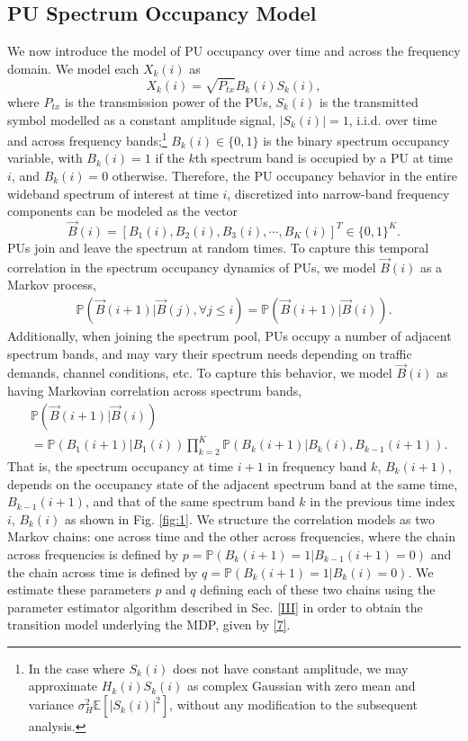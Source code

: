 \documentclass[10pt,twocolumn]{IEEEtran}
\begin{document}
\subsection{PU Spectrum Occupancy Model}
We now introduce the model of PU occupancy over time and across the frequency domain. We model each $X_k(i)$ as 
\begin{equation}\label{4}
    X_k(i) = \sqrt{P_{tx}}B_k(i)S_k(i),
\end{equation}
where $P_{tx}$ is the transmission power of the PUs, $S_k(i)$ is the transmitted symbol modelled as a constant amplitude signal, $|S_k(i)|{=}1$, i.i.d. over time and across frequency bands;\footnote{In the case where $S_k(i)$ does not have constant amplitude, we may approximate $H_{k}(i)S_{k}(i)$ as complex Gaussian with zero mean and variance $\sigma_H^2\mathbb E[|S_{k}(i)|^2]$, without any modification to the subsequent analysis.} $B_k(i){\in}\{0,1\}$ is the binary spectrum occupancy variable, with $B_k(i){=}1$ if the $k$th spectrum band is occupied by a PU at time $i$, and $B_k(i){=}0$ otherwise. Therefore, the PU occupancy behavior in the entire wideband spectrum of interest at time $i$, discretized into narrow-band frequency components can be modeled as the vector 
\begin{equation}\label{5}
    \vec{B}(i) = [B_1(i), B_2(i), B_3(i), \cdots, B_K(i)]^T {\in} \{0, 1\}^K.
\end{equation}
PUs join and leave the spectrum at random times. To capture this temporal correlation in the spectrum occupancy dynamics of PUs, we model $\vec{B}(i)$ as a Markov process,
\begin{equation}\label{6}
    \begin{aligned}
        \mathbb{P}(\vec{B}(i+1)|\vec{B}(j), \forall j \leq i) = \mathbb{P}(\vec{B}(i+1)|\vec{B}(i)).
    \end{aligned}
\end{equation}
Additionally, when joining the spectrum pool, PUs occupy a number of adjacent spectrum bands, and may vary their spectrum needs depending on traffic demands, channel conditions, etc. To capture this behavior, we model $\vec{B}(i)$ as having Markovian correlation across spectrum bands,
\begin{align}\label{7}
&         \mathbb{P}(\vec{B}(i+1)|\vec{B}(i))\\&=
\nonumber
         \mathbb{P}(B_{1}(i+1)|B_{1}(i))
         \prod_{k=2}^{K} \mathbb{P}(B_{k}(i+1)|B_{k}(i), B_{k-1}(i+1)).
\end{align}
That is, the spectrum occupancy at time $i+1$ in frequency band $k$, $B_{k}(i+1)$, depends on the  occupancy state of the adjacent spectrum band at the same time, $B_{k-1}(i+1)$, and that of the same spectrum band $k$ in the previous time index $i$, $B_{k}(i)$ as shown in Fig. \ref{fig:1}. We structure the correlation models as two Markov chains: one across time and the other across frequencies, where the chain across frequencies is defined by $p{=}\mathbb{P}(B_{k}(i+1){=}1|B_{k-1}(i+1){=}0)$ and the chain across time is defined by $q{=}\mathbb{P}(B_{k}(i+1){=}1|B_{k}(i){=}0)$. We estimate these parameters $p$ and $q$ defining each of these two chains using the parameter estimator algorithm described in Sec. \ref{III} in order to obtain the transition model underlying the MDP, given by \eqref{7}.
\end{document}
